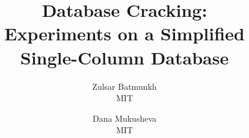 \documentclass[preprint,journal]{vgtc}       %
\title{Database Cracking:\\ Experiments on a Simplified Single-Column Database}
\author{Zulsar Batmunkh\\
	\scriptsize MIT 
	\and Dana Mukusheva\\
	\scriptsize MIT 
	}
\begin{document}
\maketitle









%
%

{}

%
%
\end{document}
